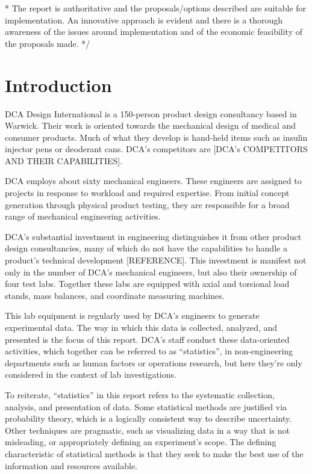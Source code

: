 \documentclass[11pt,a4paper,article]{memoir} %
\begin{document}
\/* The report is authoritative and the proposals/options
described are suitable for implementation. An
innovative approach is evident and there is a
thorough awareness of the issues around
implementation and of the economic feasibility of the
proposals made. */

\newpage
\chapter{Introduction}
DCA Design International is a 150-person product design consultancy based in Warwick. Their work is oriented towards the mechanical design of medical and consumer products. Much of what they develop is hand-held items such as insulin injector pens or deoderant cans. DCA's competitors are [DCA's COMPETITORS AND THEIR CAPABILITIES].
\par
DCA employs about sixty mechanical engineers. These engineers are assigned to projects in response to workload and required expertise. From initial concept generation through physical product testing, they are responsible for a broad range of mechanical engineering activities.
\par
DCA's substantial investment in engineering distinguishes it from other product design consultancies, many of which do not have the capabilities to handle a product's technical development [REFERENCE]. This investment is manifest not only in the number of DCA's mechanical engineers, but also their ownership of four test labs. Together these labs are equipped with axial and torsional load stands, mass balances, and coordinate measuring machines.
\par
This lab equipment is regularly used by DCA's engineers to generate experimental data. The way in which this data is collected, analyzed, and presented is the focus of this report. DCA's staff conduct these data-oriented activities, which together can be referred to as ``statistics'', in non-engineering departments such as human factors or operations research, but here they're only considered in the context of lab investigations.
\par
To reiterate, ``statistics'' in this report refers to the systematic collection, analysis, and presentation of data. Some statistical methods are justified via probability theory, which is a logically consistent way to describe uncertainty. Other techniques are pragmatic, such as visualizing data in a way that is not misleading, or appropriately defining an experiment's scope. The defining characteristic of statistical methods is that they seek to make the best use of the information and resources available.
\end{document}
